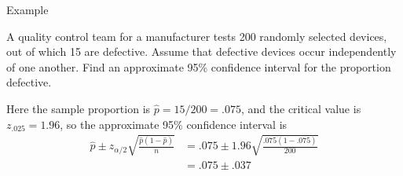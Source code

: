 \documentclass[t,handout]{beamer}
\begin{document}
    \begin{frame}{Example}
    \begin{block}{}
    A quality control team for a manufacturer tests 200 randomly selected devices, out of which 15 are defective. Assume that defective devices occur independently of one another. Find an approximate 95\% confidence interval for the proportion defective.
    \end{block}
    Here the sample proportion is $\hat p=15/200=.075$, and the critical value is $z_{.025}=1.96$, so the approximate 95\% confidence interval is
    \begin{align*}
    \hat p \pm z_{\alpha/2}\sqrt{\frac{\hat p(1-\hat p)}n} &= .075 \pm 1.96\sqrt{\frac{.075(1-.075)}{200}} \\
    &= .075 \pm .037
    \end{align*}
    \end{frame}
    
    
\end{document}
